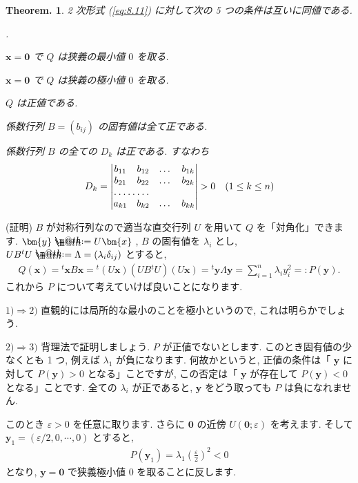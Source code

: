 \documentclass[openany, a4paper, oneside]{jsbook}
\makeatletter
\newcounter{enum2}
\renewenvironment{enumerate}{%
\begin{list}%
{%
\arabic{enum2}.\ \,%
}%
{%
\usecounter{enum2}
\setlength{\itemindent}{0pt}%
\setlength{\leftmargin}{15pt}%
\setlength{\rightmargin}{0pt}%
\setlength{\labelsep}{0pt}%
\setlength{\labelwidth}{6pt}%
\setlength{\itemsep}{0pt}%
\setlength{\parsep}{0pt}%
\setlength{\listparindent}{0pt}%
}
}{%
\end{list}%
}
\newcommand*{\defeq}{\mathrel{\rlap{%
\raisebox{0.3ex}{$\m@th\cdot$}}%
\raisebox{-0.3ex}{$\m@th\cdot$}}%
=}
\theoremstyle{break}
\newtheorem{thm}{Theorem.}[section]
\theoremstyle{breakdefn}
\newcommand{\vep}{\varepsilon}
\makeatother
\begin{document}
\begin{thm}
2 次形式 (\ref{eq:8.11}) に対して次の 5 つの条件は互いに同値である.
\begin{enumerate}
\item[1)] $\bm{x} = \bm{0}$ で $Q$ は狭義の最小値 $0$ を取る.
\item[2)] $\bm{x} = \bm{0}$ で $Q$ は狭義の極小値 $0$ を取る.
\item[3)] $Q$ は正値である.
\item[4)] 係数行列 $B = (b_{ij})$ の固有値は全て正である.
\item[5)] 係数行列 $B$ の全ての $D_k$ は正である. すなわち
\begin{align}
D_k
=
\begin{vmatrix}
b_{11} & b_{12} & \dots & b_{1k} \\
b_{21} & b_{22} & \dots & b_{2k} \\
\hdotsfor{2} \\
a_{k1} & b_{k2} & \dots & b_{k k}
\end{vmatrix}
>
0 \quad (1 \leq k \leq n )
\end{align}
\end{enumerate}
\end{thm}
(証明)
$B$ が対称行列なので適当な直交行列 $U$ を用いて $Q$ を「対角化」できます.
$\bm{y} \defeq U\bm{x}$ ,
$B$ の固有値を $\lambda_i$ とし,
$U B {^t} U \defeq \Lambda = ( \lambda_i \delta_{ij} )$ とすると,
\begin{align}
Q ( \bm{x} )
=
{^t} \bm{x} B \bm{x}
=
{^t} ( U \bm{x} ) ( U B {^t} U ) ( U \bm{x} )
=
{^t} \bm{y} \Lambda \bm{y}
=
\sum_{i=1}^n \lambda_i y_i^2
=:
P ( \bm{y} ).
\end{align}
これから $P$ について考えていけば良いことになります.

$1)\Rightarrow 2)$
直観的には局所的な最小のことを極小というので, これは明らかでしょう.

$2)\Rightarrow 3)$
背理法で証明しましょう.
$P$ が正値でないとします. このとき固有値の少なくとも 1 つ, 例えば $\lambda_1$ が負になります.
何故かというと, 正値の条件は「 $\bm{y}$ に対して $P (\bm{y})>0$ となる」ことですが,
この否定は「 $\bm{y}$ が存在して $P (\bm{y})<0$ となる」ことです.
全ての $\lambda_i$ が正であると,  $\bm{y}$ をどう取っても $P$ は負になれません.

このとき $\vep>0$ を任意に取ります. さらに $\bm{0}$ の近傍 $U (\bm{0};\vep)$ を考えます.
そして $\bm{y}_1 = ( \vep/2 , 0 , \dotsb , 0 )$ とすると,
\begin{align}
P ( \bm{y}_1 )
=
\lambda_1  \left ( \frac{\vep} {2} \right) ^2
<
0
\end{align}
となり,  $\bm{y}=\bm{0}$ で狭義極小値 $0$ を取ることに反します.
\end{document}

